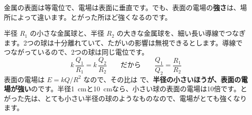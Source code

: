 \label{ph:電-2:sec12}
金属の表面は等電位で、電場は表面に垂直です。でも、表面の電場の\textbf{強さ}は、場所によって違います。とがった所ほど強くなるのです。

半径 $R_1$ の小さな金属球と、半径 $R_2$ の大きな金属球を、細い長い導線でつなぎます。2つの球は十分離れていて、たがいの影響は無視できるとします。導線でつながっているので、2つの球は同じ電位です。
\[k\,\frac{Q_1}{R_1}=k\,\frac{Q_2}{R_2}\qquad\text{だから}\qquad\frac{Q_1}{Q_2}=\frac{R_1}{R_2}\]
表面の電場は $E=kQ/R^2$ なので、その比は
で、\textbf{半径の小さいほうが、表面の電場が強い}のです。半径\qty{1}{cm}と\qty{10}{cm}なら、小さい球の表面の電場は10倍です。とがった先は、とても小さい半径の球のようなものなので、電場がとても強くなります。

